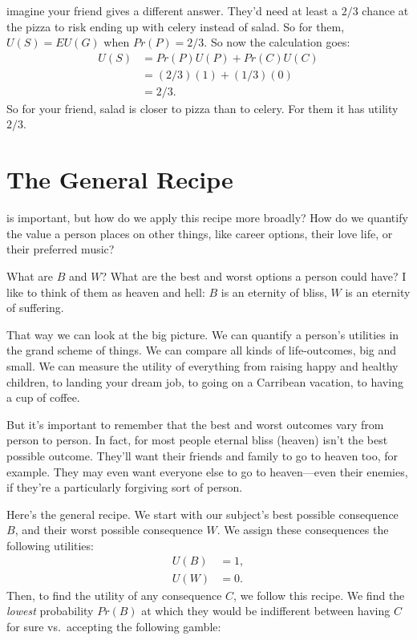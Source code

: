 \documentclass[justified]{tufte-book}
\renewcommand{\u}{U}
\newcommand{\p}{Pr}
\newcommand{\EU}{EU}
\theoremstyle{definition}
\theoremstyle{definition}
\theoremstyle{definition}
\theoremstyle{remark}
\begin{document}
 imagine your friend gives a different answer. They'd
need at least a \(2/3\) chance at the pizza to risk ending up with
celery instead of salad. So for them, \(\u(S) = \EU(G)\) when
\(\p(P) = 2/3\). So now the calculation goes: \[
  \begin{aligned}
    \u(S) &= \p(P)\u(P) + \p(C)\u(C)\\
      &= (2/3)(1) + (1/3)(0)\\
      &= 2/3.
  \end{aligned}
\] So for your friend, salad is closer to pizza than to celery. For them
it has utility \(2/3\).

\hypertarget{the-general-recipe}{%
\section{The General Recipe}\label{the-general-recipe}}

 is important, but how do we apply this recipe more
broadly? How do we quantify the value a person places on other things,
like career options, their love life, or their preferred music?

\begin{marginfigure}
What are \(B\) and \(W\)? What are the best and worst options a person
could have? I like to think of them as heaven and hell: \(B\) is an
eternity of bliss, \(W\) is an eternity of suffering.

That way we can look at the big picture. We can quantify a person's
utilities in the grand scheme of things. We can compare all kinds of
life-outcomes, big and small. We can measure the utility of everything
from raising happy and healthy children, to landing your dream job, to
going on a Carribean vacation, to having a cup of coffee.

But it's important to remember that the best and worst outcomes vary
from person to person. In fact, for most people eternal bliss (heaven)
isn't the best possible outcome. They'll want their friends and family
to go to heaven too, for example. They may even want everyone else to go
to heaven---even their enemies, if they're a particularly forgiving sort
of person.
\end{marginfigure}

Here's the general recipe. We start with our subject's best possible
consequence \(B\), and their worst possible consequence \(W\). We assign
these consequences the following utilities: \[
  \begin{aligned}
    \u(B) &= 1,\\
    \u(W) &= 0.
  \end{aligned}
\] Then, to find the utility of any consequence \(C\), we follow this
recipe. We find the \emph{lowest} probability \(\p(B)\) at which they
would be indifferent between having \(C\) for sure vs.~accepting the
following gamble:
\end{document}
